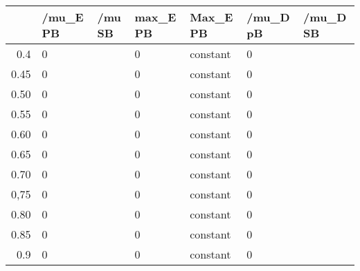 \begin{table}[ht]
\centering
\begin{tabular}{rllllll}
  \hline
 & /mu\_E PB & /mu SB & max\_E PB & Max\_E PB & /mu\_D pB & /mu\_D SB \\ 
  \hline
0.4 & 0 &  & 0 & constant & 0 &  \\ 
  0.45 & 0 &  & 0 & constant & 0 &  \\ 
  0.50 & 0 &  & 0 & constant & 0 &  \\ 
  0.55 & 0 &  & 0 & constant & 0 &  \\ 
  0.60 & 0 &  & 0 & constant & 0 &  \\ 
  0.65 & 0 &  & 0 & constant & 0 &  \\ 
  0.70 & 0 &  & 0 & constant & 0 &  \\ 
  0,75 & 0 &  & 0 & constant & 0 &  \\ 
  0.80 & 0 &  & 0 & constant & 0 &  \\ 
  0.85 & 0 &  & 0 & constant & 0 &  \\ 
  0.9 & 0 &  & 0 & constant & 0 &  \\ 
   \hline
\end{tabular}
\end{table}

